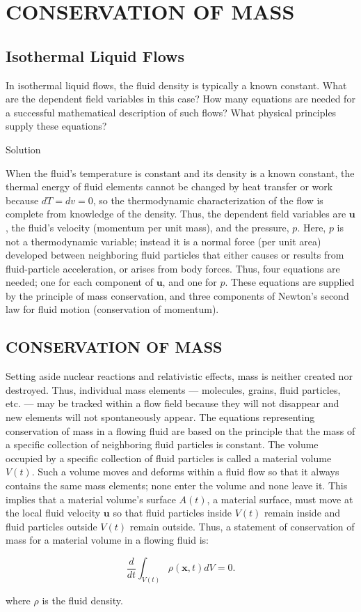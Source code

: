 \documentclass{article}
\begin{document}
\section{CONSERVATION OF MASS}

\subsection{Isothermal Liquid Flows}

In isothermal liquid flows, the fluid density is typically a known constant. What are the dependent field variables in this case? How many equations are needed for a successful mathematical description of such flows? What physical principles supply these equations?

Solution

When the fluid’s temperature is constant and its density is a known constant, the thermal energy of fluid elements cannot be changed by heat transfer or work because $dT = dv = 0$, so the thermodynamic characterization of the flow is complete from knowledge of the density. Thus, the dependent field variables are $\mathbf{u}$, the fluid's velocity (momentum per unit mass), and the pressure, $p$. Here, $p$ is not a thermodynamic variable; instead it is a normal force (per unit area) developed between neighboring fluid particles that either causes or results from fluid-particle acceleration, or arises from body forces. Thus, four equations are needed; one for each component of $\mathbf{u}$, and one for $p$. These equations are supplied by the principle of mass conservation, and three components of Newton's second law for fluid motion (conservation of momentum).

\subsection{CONSERVATION OF MASS}

Setting aside nuclear reactions and relativistic effects, mass is neither created nor destroyed. Thus, individual mass elements — molecules, grains, fluid particles, etc. — may be tracked within a flow field because they will not disappear and new elements will not spontaneously appear. The equations representing conservation of mass in a flowing fluid are based on the principle that the mass of a specific collection of neighboring fluid particles is constant. The volume occupied by a specific collection of fluid particles is called a material volume $V(t)$. Such a volume moves and deforms within a fluid flow so that it always contains the same mass elements; none enter the volume and none leave it. This implies that a material volume's surface $A(t)$, a material surface, must move at the local fluid velocity $\mathbf{u}$ so that fluid particles inside $V(t)$ remain inside and fluid particles outside $V(t)$ remain outside. Thus, a statement of conservation of mass for a material volume in a flowing fluid is:

$$
\frac{d}{dt}\int_{V(t)} \rho(\mathbf{x}, t) d V=0.
$$

where $\rho$ is the fluid density.
\end{document}
